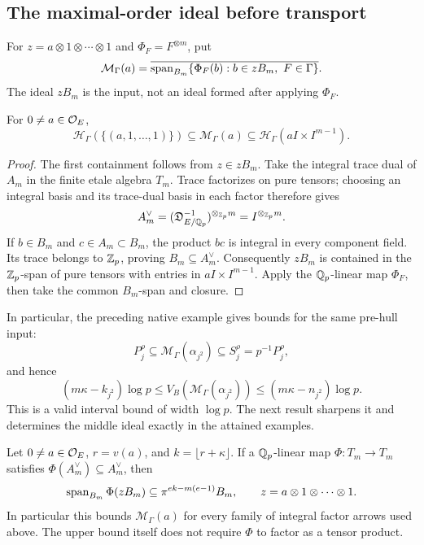\subsection{The maximal-order ideal before transport}

For $z=a\otimes1\otimes\cdots\otimes1$ and
$\Phi_F=F^{\otimes m}$, put
\begin{equation}\label{eq:np-preideal}
 \mathcal M_\Gamma(a)=
 \overline{\operatorname{span}_{B_m}
       \{\Phi_F(b):b\in zB_m,\ F\in\Gamma\}}.
\end{equation}
The ideal $zB_m$ is the input, not an ideal formed after
applying $\Phi_F$.

\begin{proposition}
\label{prop:np-sandwich}
For $0\ne a\in\mathcal O_E$,
\begin{equation}\label{eq:np-sandwich}
 \mathcal H_\Gamma(\{(a,1,\ldots,1)\})
       \subseteq\mathcal M_\Gamma(a)
       \subseteq\mathcal H_\Gamma(aI\times I^{m-1}).
\end{equation}
\end{proposition}
\begin{proof}
The first containment follows from $z\in zB_m$.
Take the integral trace dual of $A_m$ in the finite etale
algebra $T_m$. Trace factorizes on pure tensors; choosing
an integral basis and its trace-dual basis in each factor
therefore gives
\[
 A_m^\vee
    =(\mathfrak D_{E/\mathbb Q_p}^{-1})^{\otimes_{\mathbb Z_p}m}
    =I^{\otimes_{\mathbb Z_p}m}.
\]
If $b\in B_m$ and $c\in A_m\subset B_m$, the product
$bc$ is integral in every component field. Its trace
belongs to $\mathbb Z_p$, proving $B_m\subseteq A_m^\vee$.
Consequently $zB_m$ is contained in the $\mathbb Z_p$-span
of pure tensors with entries in $aI\times I^{m-1}$.
Apply the $\mathbb Q_p$-linear map $\Phi_F$, then take the
common $B_m$-span and closure.
\end{proof}

In particular, the preceding native example gives bounds
for the same pre-hull input:
\begin{equation}\label{eq:np-native-interval}
 P_j^\rho\subseteq\mathcal M_\Gamma(\alpha_{j^2})
       \subseteq S_j^\rho=p^{-1}P_j^\rho,
\end{equation}
and hence
\[
 (m\kappa-k_{j^2})\log p
 \le V_B(\mathcal M_\Gamma(\alpha_{j^2}))
 \le(m\kappa-n_{j^2})\log p.
\]
This is a valid interval bound of width $\log p$.
The next result sharpens it and determines the middle
ideal exactly in the attained examples.

\begin{proposition}
\label{prop:np-sharp-preideal}
Let $0\ne a\in\mathcal O_E$, $r=v(a)$, and
$k=\lfloor r+\kappa\rfloor$. If a $\mathbb Q_p$-linear map
$\Phi:T_m\to T_m$ satisfies
$\Phi(A_m^\vee)\subseteq A_m^\vee$, then
\begin{equation}\label{eq:np-sharp-preideal}
 \operatorname{span}_{B_m}\Phi(zB_m)
       \subseteq\pi^{ek-m(e-1)}B_m,
 \qquad z=a\otimes1\otimes\cdots\otimes1.
\end{equation}
In particular this bounds $\mathcal M_\Gamma(a)$ for
every family of integral factor arrows used above.
The upper bound itself does not require $\Phi$ to
factor as a tensor product.
\end{proposition}

